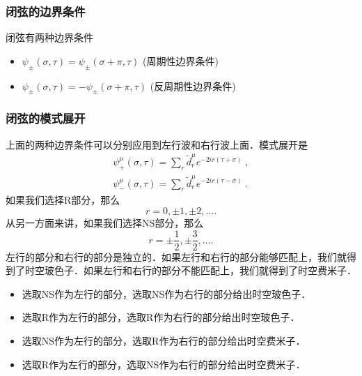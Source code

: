 \subsubsection{闭弦的边界条件}
闭弦有两种边界条件
\begin{itemize}
\item $\psi_{\pm}(\sigma,\tau) = \psi_{\pm}(\sigma+\pi,\tau)$ (周期性边界条件) 
\item $\psi_{\pm}(\sigma,\tau) = -\psi_{\pm}(\sigma+\pi,\tau)$ (反周期性边界条件)
\end{itemize}

\subsubsection{闭弦的模式展开}
上面的两种边界条件可以分别应用到左行波和右行波上面．模式展开是
\begin{equation}
\begin{aligned}
\psi^\mu_+(\sigma,\tau) = \sum_r \tilde d^\mu_r e^{- 2 i r (\tau+\sigma)}~, \\
\psi^\mu_-(\sigma,\tau) = \sum_r \tilde d^\mu_r e^{- 2 i r (\tau-\sigma)}~.
\end{aligned}
\end{equation}
如果我们选择R部分，那么
\begin{equation}
r = 0, \pm 1, \pm 2, \ldots .
\end{equation}
从另一方面来讲，如果我们选择NS部分，那么
\begin{equation}
r = \pm \frac{1}{2}, \pm \frac{3}{2}, \ldots.
\end{equation}
左行的部分和右行的部分是独立的．如果左行和右行的部分能够匹配上，我们就得到了时空玻色子．如果左行和右行的部分不能匹配上，我们就得到了时空费米子．
\begin{itemize}
\item 选取NS作为左行的部分，选取NS作为右行的部分给出时空玻色子． 
\item 选取R作为左行的部分，选取R作为右行的部分给出时空玻色子．
\item 选取NS作为左行的部分，选取R作为右行的部分给出时空费米子．
\item 选取R作为左行的部分，选取NS作为右行的部分给出时空费米子．
\end{itemize}


